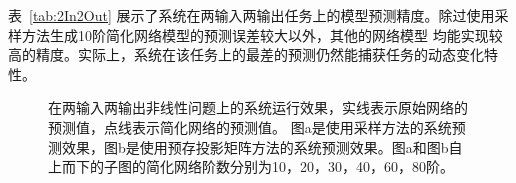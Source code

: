 表~\ref{tab:2In2Out} 展示了系统在两输入两输出任务上的模型预测精度。除过使用采样方法生成10阶简化网络模型的预测误差较大以外，其他的网络模型
均能实现较高的精度。实际上，系统在该任务上的最差的预测仍然能捕获任务的动态变化特性。

\begin{figure}
	\centering
	\caption{在两输入两输出非线性问题上的系统运行效果，实线表示原始网络的预测值，点线表示简化网络的预测值。
		图a是使用采样方法的系统预测效果，图b是使用预存投影矩阵方法的系统预测效果。图a和图b自上而下的子图的简化网络阶数分别为10，20，30，40，60，80阶。}
	\label{fig:2In2Out}
\end{figure}


